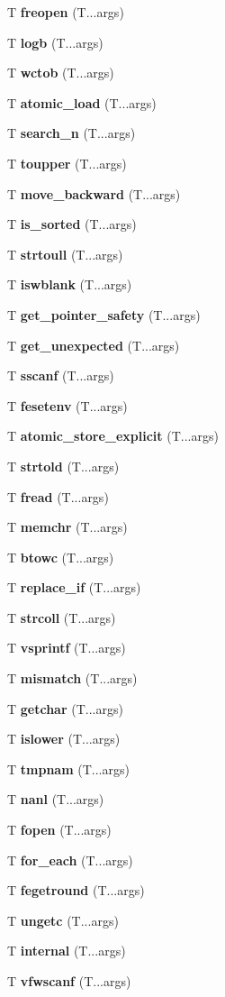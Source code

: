 \begin{DoxyCompactItemize}
T {\bf freopen} (T...\+args)
\item 
T {\bf logb} (T...\+args)
\item 
T {\bf wctob} (T...\+args)
\item 
T {\bf atomic\+\_\+load} (T...\+args)
\item 
T {\bf search\+\_\+n} (T...\+args)
\item 
T {\bf toupper} (T...\+args)
\item 
T {\bf move\+\_\+backward} (T...\+args)
\item 
T {\bf is\+\_\+sorted} (T...\+args)
\item 
T {\bf strtoull} (T...\+args)
\item 
T {\bf iswblank} (T...\+args)
\item 
T {\bf get\+\_\+pointer\+\_\+safety} (T...\+args)
\item 
T {\bf get\+\_\+unexpected} (T...\+args)
\item 
T {\bf sscanf} (T...\+args)
\item 
T {\bf fesetenv} (T...\+args)
\item 
T {\bf atomic\+\_\+store\+\_\+explicit} (T...\+args)
\item 
T {\bf strtold} (T...\+args)
\item 
T {\bf fread} (T...\+args)
\item 
T {\bf memchr} (T...\+args)
\item 
T {\bf btowc} (T...\+args)
\item 
T {\bf replace\+\_\+if} (T...\+args)
\item 
T {\bf strcoll} (T...\+args)
\item 
T {\bf vsprintf} (T...\+args)
\item 
T {\bf mismatch} (T...\+args)
\item 
T {\bf getchar} (T...\+args)
\item 
T {\bf islower} (T...\+args)
\item 
T {\bf tmpnam} (T...\+args)
\item 
T {\bf nanl} (T...\+args)
\item 
T {\bf fopen} (T...\+args)
\item 
T {\bf for\+\_\+each} (T...\+args)
\item 
T {\bf fegetround} (T...\+args)
\item 
T {\bf ungetc} (T...\+args)
\item 
T {\bf internal} (T...\+args)
\item 
T {\bf vfwscanf} (T...\+args)
\item 

\end{DoxyCompactItemize}

